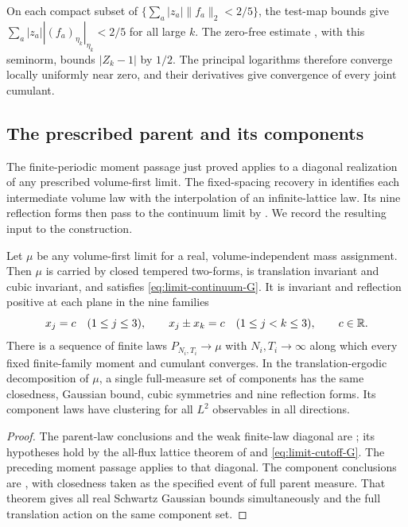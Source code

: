 On each compact subset of
$\{\sum_a|z_a|\|f_a\|_2<2/5\}$, the test-map bounds give
$\sum_a|z_a||(f_a)_{\eta_k}|_{\eta_k}<2/5$ for all large $k$.
The zero-free estimate , with this
seminorm, bounds $|Z_k-1|$ by $1/2$. The principal logarithms
therefore converge locally uniformly near zero, and their
derivatives give convergence of every joint cumulant.

\subsection{The prescribed parent and its components}

The finite-periodic moment passage just proved applies to a
diagonal realization of any prescribed volume-first limit.
The fixed-spacing recovery in \cite[Proposition~7.3]{ContinuumLimits}
identifies each intermediate volume law with the interpolation
of an infinite-lattice law. Its nine reflection forms then pass
to the continuum limit by \cite[Corollary~7.4]{ContinuumLimits}.
We record the resulting input to the construction.

\begin{proposition}\label{prop:limit-nine-mirrors}
Let $\mu$ be any volume-first limit for a real, volume-independent
mass assignment. Then $\mu$ is carried by closed tempered two-forms,
is translation invariant and cubic invariant, and satisfies
\eqref{eq:limit-continuum-G}. It is invariant and reflection
positive at each plane in the nine families
\[
 x_j=c\quad(1\le j\le3),\qquad
 x_j\pm x_k=c\quad(1\le j<k\le3),\qquad c\in\mathbb R.
\]
There is a sequence of finite laws $P_{N_i,T_i}\to\mu$ with
$N_i,T_i\to\infty$ along which every fixed finite-family moment
and cumulant converges. In the translation-ergodic decomposition
of $\mu$, a single full-measure set of components has the same
closedness, Gaussian bound, cubic symmetries and nine reflection
forms. Its component laws have clustering for all $L^2$ observables
in all directions.
\end{proposition}

\begin{proof}
The parent-law conclusions and the weak finite-law diagonal are
\cite[Corollary~7.4]{ContinuumLimits}; its hypotheses hold by
the all-flux lattice theorem of \cite[Theorem~A]{ChamberLattice}
and \eqref{eq:limit-cutoff-G}. The preceding moment passage
applies to that diagonal. The component conclusions are
\cite[Theorem~A]{ErgodicComponents}, with closedness taken as the
specified event of full parent measure. That theorem gives all
real Schwartz Gaussian bounds simultaneously and the full
translation action on the same component set.
\end{proof}

